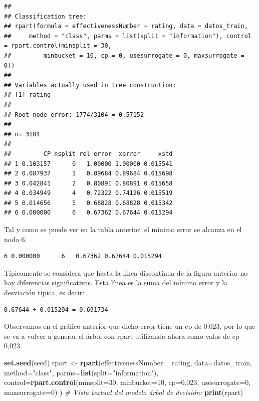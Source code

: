 \documentclass[spanish,]{article}
\newenvironment{Shaded}{\begin{snugshade}}{\end{snugshade}}
\newcommand{\KeywordTok}[1]{\textcolor[rgb]{0.13,0.29,0.53}{\textbf{#1}}}
\newcommand{\DataTypeTok}[1]{\textcolor[rgb]{0.13,0.29,0.53}{#1}}
\newcommand{\DecValTok}[1]{\textcolor[rgb]{0.00,0.00,0.81}{#1}}
\newcommand{\FloatTok}[1]{\textcolor[rgb]{0.00,0.00,0.81}{#1}}
\newcommand{\StringTok}[1]{\textcolor[rgb]{0.31,0.60,0.02}{#1}}
\newcommand{\CommentTok}[1]{\textcolor[rgb]{0.56,0.35,0.01}{\textit{#1}}}
\newcommand{\OperatorTok}[1]{\textcolor[rgb]{0.81,0.36,0.00}{\textbf{#1}}}
\newcommand{\NormalTok}[1]{#1}
\begin{document}
\begin{verbatim}
## 
## Classification tree:
## rpart(formula = effectivenessNumber ~ rating, data = datos_train, 
##     method = "class", parms = list(split = "information"), control = rpart.control(minsplit = 30, 
##         minbucket = 10, cp = 0, usesurrogate = 0, maxsurrogate = 0))
## 
## Variables actually used in tree construction:
## [1] rating
## 
## Root node error: 1774/3104 = 0.57152
## 
## n= 3104 
## 
##         CP nsplit rel error  xerror     xstd
## 1 0.103157      0   1.00000 1.00000 0.015541
## 2 0.087937      1   0.89684 0.89684 0.015698
## 3 0.042841      2   0.80891 0.80891 0.015658
## 4 0.034949      4   0.72322 0.74126 0.015519
## 5 0.014656      5   0.68828 0.68828 0.015342
## 6 0.000000      6   0.67362 0.67644 0.015294
\end{verbatim}

Tal y como se puede ver en la tabla anterior, el mínimo error se alcanza
en el nodo 6.

\begin{verbatim}
6 0.000000      6   0.67362 0.67644 0.015294
\end{verbatim}

Típicamente se considera que hasta la línea discontinua de la figura
anterior no hay diferencias significativas. Esta línea es la suma del
mínimo error y la desviación típica, es decir:

\begin{verbatim}
0.67644 + 0.015294 = 0.691734
\end{verbatim}

Observamos en el gráfico anterior que dicho error tiene un cp de 0.023,
por lo que se va a volver a generar el árbol con rpart utilizando ahora
como valor de cp 0,023.

\begin{Shaded}
\begin{Highlighting}[]
\KeywordTok{set.seed}\NormalTok{(seed)}
\NormalTok{rpart <-}\StringTok{ }\KeywordTok{rpart}\NormalTok{(effectivenessNumber }\OperatorTok{~}\StringTok{ }\NormalTok{rating, }\DataTypeTok{data=}\NormalTok{datos_train,}
                \DataTypeTok{method=}\StringTok{"class"}\NormalTok{,}
                \DataTypeTok{parms=}\KeywordTok{list}\NormalTok{(}\DataTypeTok{split=}\StringTok{"information"}\NormalTok{),}
                \DataTypeTok{control=}\KeywordTok{rpart.control}\NormalTok{(}\DataTypeTok{minsplit=}\DecValTok{30}\NormalTok{,}
                \DataTypeTok{minbucket=}\DecValTok{10}\NormalTok{,}
                \DataTypeTok{cp=}\FloatTok{0.023}\NormalTok{,}
                \DataTypeTok{usesurrogate=}\DecValTok{0}\NormalTok{,}
                \DataTypeTok{maxsurrogate=}\DecValTok{0}\NormalTok{)}
\NormalTok{              )}
\CommentTok{# Vista textual del modelo árbol de decisión:}
\KeywordTok{print}\NormalTok{(rpart)}
\end{Highlighting}
\end{Shaded}
\end{document}
